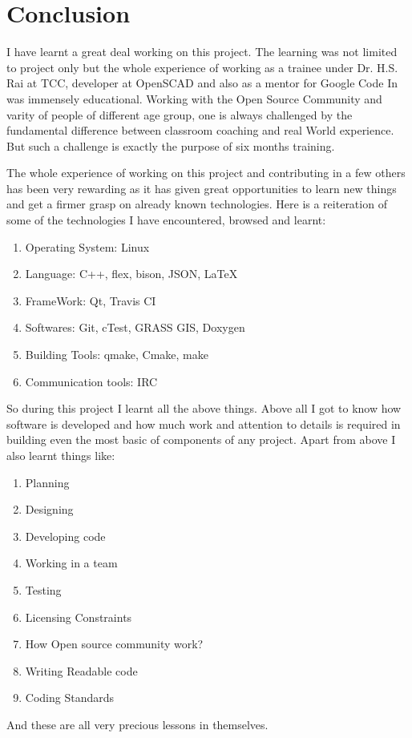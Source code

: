 \section{Conclusion}

I have learnt a great deal working on this project. The learning was not limited to project only but
the whole experience of working as a trainee under Dr. H.S. Rai at TCC, developer at OpenSCAD and also as a mentor for Google Code In was immensely educational. Working with the Open Source Community and varity of people of different age group, one is always challenged by the fundamental difference between classroom coaching and real World experience. But such a challenge is exactly the
purpose of six months training.

The whole experience of working on this project and contributing in a few others has been very
rewarding as it has given great opportunities to learn new things and get a firmer grasp on already
known technologies. Here is a reiteration of some of the technologies I have encountered, browsed and learnt:
\begin{enumerate}
	\item Operating System: Linux
	\item Language: C++, flex, bison, JSON, \LaTeX
	\item FrameWork: Qt, Travis CI
	\item Softwares: Git, cTest, GRASS GIS, Doxygen
	\item Building Tools: qmake, Cmake, make
	\item Communication tools: IRC
\end{enumerate}
So during this project I learnt all the above things. Above all I got to know how software is
developed and how much work and attention to details is required in building even the most basic
of components of any project. Apart from above I also learnt things like: 
\begin{enumerate}
	\item Planning
	\item Designing
	\item Developing code
	\item Working in a team
	\item Testing
	\item Licensing Constraints
	\item How Open source community work?
	\item Writing Readable code
	\item Coding Standards
\end{enumerate}
And these are all very precious lessons in themselves.
